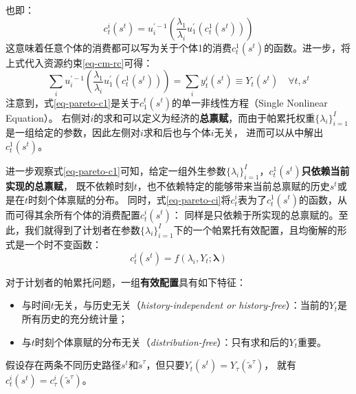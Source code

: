 也即：
\begin{equation}    \label{eq-pareto-ci}
    c_t^i\left(s^t\right)=u_i^{\prime-1}\left(\frac{\lambda_1}{\lambda_i} u_1^{\prime}\left(c_t^1\left(s^t\right)\right)\right)
\end{equation}
这意味着任意个体的消费都可以写为关于个体1的消费$c_t^1\left(s^t\right)$的函数。进一步，将上式代入资源约束\ref{eq-cm-rc}可得：
\begin{equation}    \label{eq-pareto-c1}
    \sum_i u_i^{\prime-1}\left(\frac{\lambda_1}{\lambda_i} u_1^{\prime}\left(c_t^1\left(s^t\right)\right)\right)
        =\sum_i y_t^i\left(s^t\right) \equiv Y_t\left(s^t\right) \quad \forall t, s^t
\end{equation}
注意到，式\ref{eq-pareto-c1}是关于$c_1^t\left(s^t\right)$的单一非线性方程（Single Nonlinear Equation）。
右侧对$i$的求和可以定义为经济的\textbf{总禀赋}，而由于帕累托权重$\{\lambda_i\}_{i=1}^I$是一组给定的参数，因此左侧对$i$求和后也与个体$i$无关，
进而可以从中解出$c_t^1\left(s^t\right)$。

进一步观察式\ref{eq-pareto-c1}可知，给定一组外生参数$\{\lambda_i\}_{i=1}^I$，$c_t^1\left(s^t\right)$\textbf{只依赖当前实现的总禀赋}，
既不依赖时刻$t$，也不依赖特定的能够带来当前总禀赋的历史$s^t$或是在$t$时刻个体禀赋的分布。
同时，式\ref{eq-pareto-ci}将$c_t^i$表为了$c_t^1\left(s^t\right)$的函数，从而可得其余所有个体的消费配置$c_t^i\left(s^t\right)$：
同样是只依赖于所实现的总禀赋的。至此，我们就得到了计划者在参数$\{\lambda_i\}_{i=1}^I$下的一个帕累托有效配置，且均衡解的形式是一个时不变函数：
\begin{equation*}
    c_t^i\left(s^t\right) = f\left(\lambda_i, Y_t ; \boldsymbol{\lambda}\right)
\end{equation*}

\begin{property}
    对于计划者的帕累托问题，一组\textbf{有效配置}具有如下特征：
    \begin{itemize}
        \item 与时间$t$无关，与历史无关（\textit{history-independent or history-free}）：当前的$Y_t$是所有历史的充分统计量；
        \item 与$t$时刻个体禀赋的分布无关（\textit{distribution-free}）：只有求和后的$Y_t$重要。
    \end{itemize}
\end{property}
假设存在两条不同历史路径$s^t$和$\tilde{s}^{\tau}$，但只要$Y_t\left(s^t\right)=Y_{\tau}\left(\tilde{s}^{\tau}\right)$，
就有$c_t^i\left(s^t\right)=c_{\tau}^i\left(\tilde{s}^\tau\right)$。

